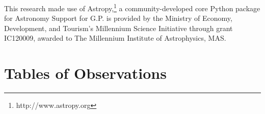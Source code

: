 \documentclass[a4paper,fleqn,usenatbib]{mnras}
\begin{document}
This research made use of Astropy,\footnote{http://www.astropy.org} a community-developed core Python package for Astronomy \citep{astropy:2013, astropy:2018}
Support for G.P. is provided by the Ministry of Economy, Development, and Tourism's Millennium Science Initiative through grant IC120009, awarded to The Millennium Institute of Astrophysics, MAS.\\




\appendix
\section{Tables of Observations}


\end{document}
